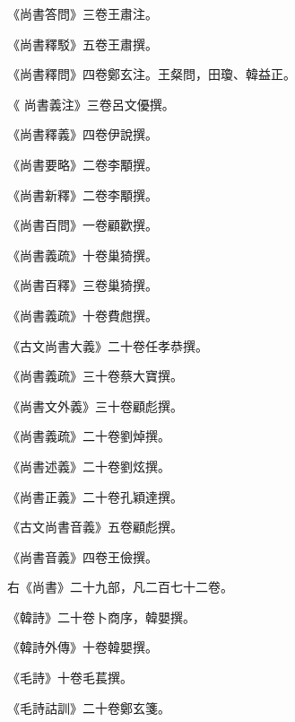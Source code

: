 \begin{pinyinscope}
 《尚書答問》三卷王肅注。



 《尚書釋駁》五卷王肅撰。



 《尚書釋問》四卷鄭玄注。王粲問，田瓊、韓益正。



 《
 尚書義注》三卷呂文優撰。



 《尚書釋義》四卷伊說撰。



 《尚書要略》二卷李顒撰。



 《尚書新釋》二卷李顒撰。



 《尚書百問》一卷顧歡撰。



 《尚書義疏》十卷巢猗撰。



 《尚書百釋》三卷巢猗撰。



 《尚書義疏》十卷費甝撰。



 《古文尚書大義》二十卷任孝恭撰。



 《尚書義疏》三十卷蔡大寶撰。



 《尚書文外義》三十卷顧彪撰。



 《尚書義疏》二十卷劉焯撰。



 《尚書述義》二十卷劉炫撰。



 《尚書正義》二十卷孔穎達撰。



 《古文尚書音義》五卷顧彪撰。



 《尚書音義》四卷王儉撰。



 右《尚書》二十九部，凡二百七十二卷。



 《韓詩》二十卷卜商序，韓嬰撰。



 《韓詩外傳》十卷韓嬰撰。



 《毛詩》十卷毛萇撰。



 《毛詩詁訓》二十卷鄭玄箋。




\end{pinyinscope}
